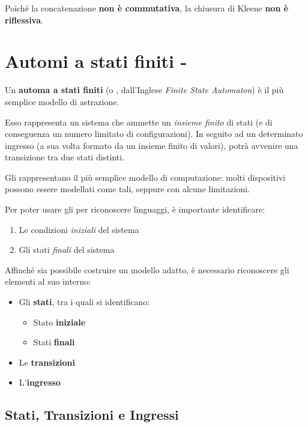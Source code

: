 \documentclass[italian, 10pt]{article}
\begin{document}
Poiché la concatenazione \textbf{non è commutativa}, la chiusura di Kleene \textbf{non è riflessiva}.

\clearpage

\section{Automi a stati finiti - \FSA}
\label{sec:automi-a-stati-finiti}

Un \textbf{automa a stati finiti} (o \FSA, dall'Inglese \textit{Finite State Automaton}) è il più semplice modello di astrazione.

Esso rappresenta un sistema che ammette un \textit{insieme finito} di stati (e di conseguenza un numero limitato di configurazioni).
In seguito ad un determinato ingresso (a sua volta formato da un insieme finito di valori), potrà avvenire una transizione tra due stati distinti.

Gli \FSA rappresentano il più semplice modello di computazione: molti dispositivi possono essere modellati come tali, seppure con alcune limitazioni.

Per poter usare gli \FSA per riconoscere linguaggi, è importante identificare:

\begin{enumerate}
  \item Le condizioni \textit{iniziali} del sistema
  \item Gli stati \textit{finali} del sistema
\end{enumerate}

Affinché sia possibile costruire un modello adatto, è necessario riconoscere gli elementi al suo interno:

\begin{itemize}
  \item Gli \textbf{stati}, tra i quali si identificano:
        \begin{itemize}
          \item Stato \textbf{iniziale}
          \item Stati \textbf{finali}
        \end{itemize}
  \item Le \textbf{transizioni}
  \item L'\textbf{ingresso}
\end{itemize}

\subsection{Stati, Transizioni e Ingressi}
\end{document}
